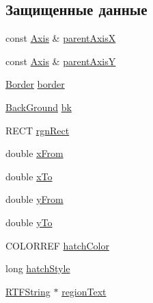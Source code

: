 \subsection*{Защищенные данные}
\begin{DoxyCompactItemize}
\item 
const \hyperlink{class_axis}{Axis} \& \hyperlink{class_plot_region_aec00a997e0e41c233d8542a9ec4d602f}{parent\-Axis\-X}
\item 
const \hyperlink{class_axis}{Axis} \& \hyperlink{class_plot_region_ae817987187aded3ddb6074f1462f9b5c}{parent\-Axis\-Y}
\item 
\hyperlink{class_border}{Border} \hyperlink{class_plot_region_a66a8e6a2f04b30da9b84a618aeef17a2}{border}
\item 
\hyperlink{class_back_ground}{Back\-Ground} \hyperlink{class_plot_region_a73dfa8e41749b8f277264bd716f3621e}{bk}
\item 
R\-E\-C\-T \hyperlink{class_plot_region_ac277b90fffff8f74744646361e3c0887}{rgn\-Rect}
\item 
double \hyperlink{class_plot_region_a17c3a91a03edc979ef6fdd2fa317fc79}{x\-From}
\item 
double \hyperlink{class_plot_region_a8f988d5b4e0ae0995b4fe457b806064e}{x\-To}
\item 
double \hyperlink{class_plot_region_acf10bb3e21dc8efeadbc2ccd128a6772}{y\-From}
\item 
double \hyperlink{class_plot_region_ad97dd7a58a12907c939ad3d764ad0a7d}{y\-To}
\item 
C\-O\-L\-O\-R\-R\-E\-F \hyperlink{class_plot_region_a12dc144f3d93052dc1b2afd355b4372e}{hatch\-Color}
\item 
long \hyperlink{class_plot_region_a0a6bac6e99e972970b90e19aa1463fe6}{hatch\-Style}
\item 
\hyperlink{class_r_t_f_string}{R\-T\-F\-String} $\ast$ \hyperlink{class_plot_region_a76d55541c5f544224d99b3f44ee3c5ea}{region\-Text}
\end{DoxyCompactItemize}


